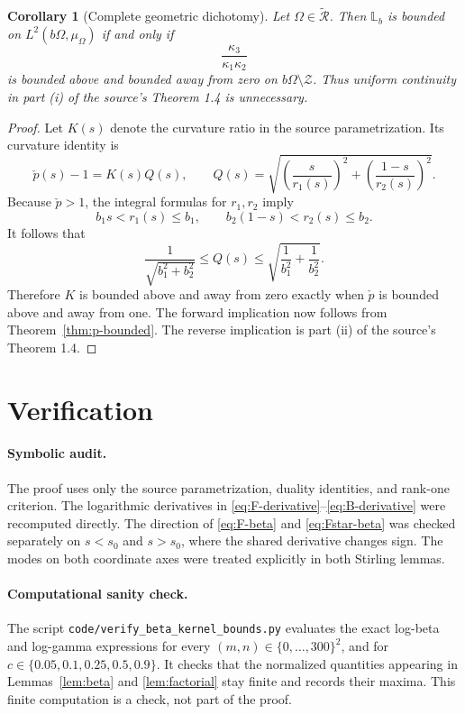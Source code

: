 \documentclass[11pt]{article}
\newtheorem{corollary}[theorem]{Corollary}
\newcommand{\Lb}{\mathbb L_b}
\newcommand{\pcheck}{\check p}
\newcommand{\Rclass}{\widetilde{\mathcal R}}
\begin{document}
\begin{corollary}[Complete geometric dichotomy]\label{cor:dichotomy}
Let \(\Omega\in\Rclass\).  Then \(\Lb\) is bounded on
\(L^2(b\Omega,\mu_\Omega)\) if and only if
\[
 \frac{\kappa_3}{\kappa_1\kappa_2}
\]
is bounded above and bounded away from zero on
\(b\Omega\setminus\mathcal Z\).  Thus uniform continuity in part (i) of
the source's Theorem 1.4 is unnecessary.
\end{corollary}

\begin{proof}
Let \(K(s)\) denote the curvature ratio in the source parametrization.  Its
curvature identity is
\begin{equation}\label{eq:curvature-p}
 \pcheck(s)-1=K(s)Q(s),\qquad
 Q(s)=
 \sqrt{\left(\frac{s}{r_1(s)}\right)^2+
       \left(\frac{1-s}{r_2(s)}\right)^2}.
\end{equation}
Because \(\pcheck>1\), the integral formulas for \(r_1,r_2\) imply
\[
 b_1s<r_1(s)\leq b_1,\qquad
 b_2(1-s)<r_2(s)\leq b_2.
\]
It follows that
\[
 \frac1{\sqrt{b_1^2+b_2^2}}
 \leq Q(s)\leq
 \sqrt{\frac1{b_1^2}+\frac1{b_2^2}}.
\]
Therefore \(K\) is bounded above and away from zero exactly when
\(\pcheck\) is bounded above and away from one.  The forward implication
now follows from Theorem~\ref{thm:p-bounded}.  The reverse implication is
part (ii) of the source's Theorem 1.4.
\end{proof}

\section{Verification}

\paragraph{Symbolic audit.}
The proof uses only the source parametrization, duality identities, and
rank-one criterion.  The logarithmic derivatives in
\eqref{eq:F-derivative}--\eqref{eq:B-derivative} were recomputed directly.
The direction of \eqref{eq:F-beta} and \eqref{eq:Fstar-beta} was checked
separately on \(s<s_0\) and \(s>s_0\), where the shared derivative changes
sign.  The modes on both coordinate axes were treated explicitly in both
Stirling lemmas.

\paragraph{Computational sanity check.}
The script \texttt{code/verify\_beta\_kernel\_bounds.py} evaluates the exact
log-beta and log-gamma expressions for every
\((m,n)\in\{0,\ldots,300\}^2\), and for
\(c\in\{0.05,0.1,0.25,0.5,0.9\}\).  It checks that the normalized quantities
appearing in Lemmas~\ref{lem:beta} and \ref{lem:factorial} stay finite and
records their maxima.  This finite computation is a check, not part of the
proof.
\end{document}
